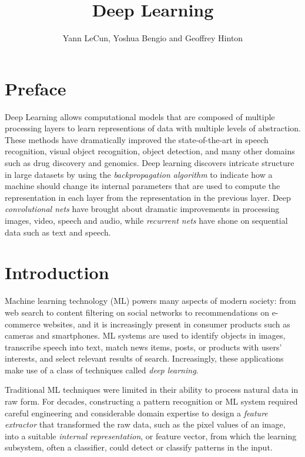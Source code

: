 \documentclass[10pts]{article}
\title{Deep Learning}
\author{Yann LeCun, Yoshua Bengio and Geoffrey Hinton}
\date{}
\begin{document}
\maketitle
\vspace*{-6mm}

\section{Preface}

Deep Learning allows computational models that are composed of multiple processing 
layers to learn representions of data with multiple levels of abstraction.
These methods have dramatically improved the state-of-the-art
in speech recognition, visual object recognition, object detection,
and many other domains such as drug discovery and genomics. Deep
learning discovers intricate structure in large datasets by using the
{\em backpropagation algorithm} to indicate how a machine should
change its internal parameters that are used to compute the representation in each layer from
the representation in the previous layer.  Deep {\em convolutional nets}
have brought about dramatic improvements in processing
images, video, speech and audio, while {\em recurrent
  nets} have shone on sequential data such as text and
speech.

\section{Introduction}

Machine learning technology (ML) powers many aspects of modern
society: from web search to content filtering on social networks 
to recommendations on e-commerce websites, and it is increasingly
present in consumer products such as cameras and smartphones. ML
systems are used to identify objects in images, transcribe speech into
text, match news items, posts, or products with users' interests, and
select relevant results of search. Increasingly, these applications
make use of a class of techniques called {\em deep learning}.

Traditional ML techniques were limited in their ability to process
natural data in raw form. For decades, constructing a pattern
recognition or ML system required careful engineering and considerable
domain
expertise to design a {\em feature extractor} that transformed the raw
data, such as the pixel values of an image, into a suitable {\em
  internal representation}, or feature vector, from which the learning
subsystem, often a classifier, could detect or classify
patterns in the input.
\end{document}
